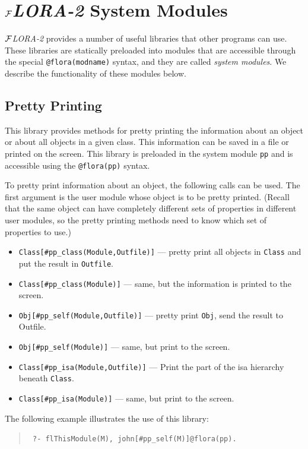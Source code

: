 \documentclass[11pt]{article}
\newcommand{\FLORA}{{\mbox{${\cal F}${\small\it LORA}\rm\emph{-2}}}\xspace}
\begin{document}
\section{\FLORA System Modules}\label{sec-service-libs}

\FLORA provides a number of useful libraries that other programs can use.
These libraries are statically preloaded into modules that are accessible
through the special {\tt @flora(modname)} syntax, and they are called
\emph{system modules}.  We describe the functionality of these modules
below.

\subsection{Pretty Printing}

This library provides methods for pretty printing the information about an
object or about all objects in a given class. This information can be saved
in a file or printed on the screen. This library is preloaded in the
system module {\tt pp} and is accessible using the {\tt @flora(pp)}
syntax.

To pretty print information about an object, the following calls can be
used.  The first argument is the user module whose object is to be pretty
printed. (Recall that the same object can have completely different sets of
properties in different user modules, so the pretty printing methods need to
know which set of properties to use.)
\begin{itemize}
  \item  {\tt Class[\#pp\_class(Module,Outfile)]} --- pretty print all
  objects in {\tt Class} and put the result in {\tt Outfile}.
\item {\tt Class[\#pp\_class(Module)]} --- same, but the information is
  printed to the screen.
\item {\tt Obj[\#pp\_self(Module,Outfile)]} --- pretty print {\tt Obj}, send
  the result to Outfile.
\item {\tt Obj[\#pp\_self(Module)]} --- same, but print to the screen.
\item {\tt Class[\#pp\_isa(Module,Outfile)]} --- Print the part of the isa
  hierarchy beneath {\tt Class}.
\item {\tt Class[\#pp\_isa(Module)]} --- same, but print to the screen.
\end{itemize}
The following example illustrates the use of this library:
\begin{quote}
 {\tt
   ?- flThisModule(M), john[\#pp\_self(M)]@flora(pp).
   }
\end{quote}
\end{document}

